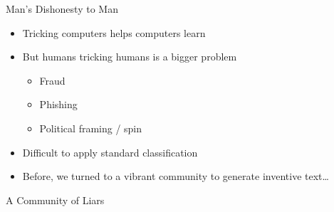 \documentclass[xcolor=dvipsnames]{beamer}
\newcommand{\fsi}[2]{
\begin{frame}[plain]
\vspace*{-1pt}
\makebox[\linewidth]{\texttt{[image: \#1]}}
\begin{center}
#2
\end{center}
\end{frame}
}
\begin{document}
\begin{frame}{Man's Dishonesty to Man}

  \begin{itemize}
  \item Tricking computers helps computers learn
  \item But humans tricking humans is a bigger problem
    \begin{itemize}
    \item Fraud
    \item Phishing
      \item Political framing / spin
      \end{itemize}
    \item Difficult to apply standard classification
      \pause
    \item Before, we turned to a vibrant community to generate
      inventive text\dots
  \end{itemize}

\end{frame}

\fsi{diplomacy/tournament}{A Community of Liars}
\end{document}
